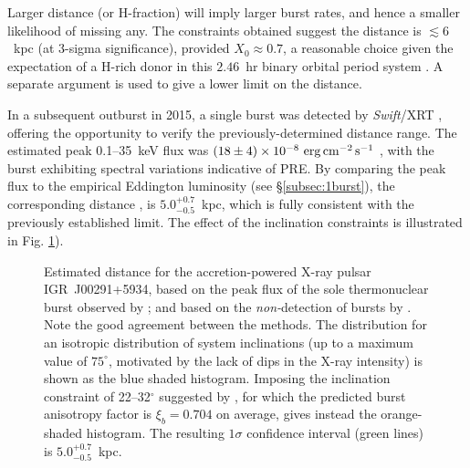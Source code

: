 \documentclass{aastex63}
\newcommand{\epcs}{{\rm erg\,cm^{-2}\,s^{-1}}}
\begin{document}
Larger distance (or H-fraction) will imply larger burst rates, and hence a smaller likelihood of missing any. The constraints obtained suggest the distance is $\lesssim6$~kpc (at 3-sigma significance), provided $X_0\approx0.7$, a reasonable choice given the expectation of a H-rich donor in this $2.46$~hr binary orbital period system \cite[]{gal05a}.  
%
A separate argument is used to give a lower limit on the distance.


%
In a subsequent outburst in 2015, a single burst was detected by {\it Swift}/XRT \cite[]{kuin15}, offering the opportunity to verify the previously-determined distance range. The estimated peak 
0.1--35~keV flux was $(18\pm4)\times10^{-8}\ \epcs$ \cite[]{defalco17}, with the burst exhibiting spectral variations indicative of PRE. By comparing the peak flux to the empirical Eddington luminosity (see \S\ref{subsec:1burst}), the corresponding distance 
\cite[including the inclination range of 22--32$^\circ$ suggested by][]{torres08},
is $5.0_{-0.5}^{+0.7}$~kpc, which is fully consistent with the previously established limit. The effect of the inclination constraints is illustrated in Fig. \ref{fig:dist_igr00291}).

\begin{figure}[ht!]
\caption{Estimated distance for the accretion-powered X-ray pulsar IGR~J00291+5934, based on the peak flux of the sole thermonuclear burst observed by \citet[][solid histograms]{defalco17};
%
and based on the {\it non-}detection of bursts by \citet[][red dashed lines]{gal06b}.
%
Note the good agreement between the methods.
%
The distribution for an isotropic distribution of system inclinations (up to a maximum value of $75^\circ$, motivated by the lack of dips in the X-ray intensity) is shown as the blue shaded histogram. Imposing the inclination constraint of 22--32$^\circ$ suggested by \cite{torres08}, for which the predicted burst anisotropy factor is $\xi_b=0.704$ on average, gives instead the orange-shaded histogram. The resulting $1\sigma$ confidence interval (green lines) is $5.0_{-0.5}^{+0.7}$~kpc.
\label{fig:dist_igr00291}}
\end{figure}
\end{document}
